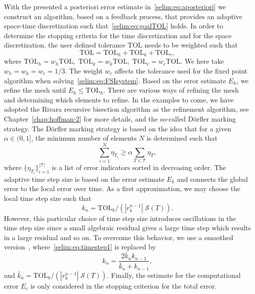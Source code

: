 With the presented a posteriori error estimate
in~\eqref{selim:eq:aposteriori} we construct an algorithm, based on a
feedback process, that provides an adaptive space-time
discretization such that~\eqref{selim:eq:goalTOL} holds. In order to
determine the stopping criteria for the time discretization and for
the space discretization, the user defined tolerance $\mathrm{TOL}$
needs to be weighted such that
\begin{equation}
\mathrm{TOL} = \mathrm{TOL}_h + \mathrm{TOL}_k + \mathrm{TOL}_c,
\end{equation}
where $\mathrm{TOL}_h = w_h \mathrm{TOL}, \;\mathrm{TOL}_k = w_k
\mathrm{TOL}, \;\mathrm{TOL}_c = w_c \mathrm{TOL}$.  We here take $w_h
= w_k = w_c = 1/3$. The weight $w_c$ affects the tolerance used for
the fixed point algorithm when
solving~\eqref{selim:eq:FSIsystem}. Based on the error estimate $E_h$,
we refine the mesh until $E_h \leq \mathrm{TOL}_h$.  There are various
ways of refining the mesh and determining which elements to refine. In
the examples to come, we have adopted the Rivara recursive bisection
algorithm as the refinement algorithm, see
Chapter~\ref{chap:hoffman-2} for more details, and the so-called
D\"{o}rfler \cite{dorfler1996} marking strategy. The D\"{o}rfler
marking strategy is based on the idea that for a given
$\alpha\in(0,1]$, the minimum number of elements $N$ is determined
  such that
\begin{equation}
  \label{selim:eq:dorfler}
\sum_{i=1}^{N}\eta_{T_i} \geq  \alpha \sum_{T\in\mathcal{T}}\eta_T ,
\end{equation}
where $\{ \eta_{T_{i}}\}_{i = 1}^{|\mathcal{T}|}$ is a list of error
indicators sorted in decreasing order.  The adaptive time step size is
based on the error estimate $E_k$ and connects the global error to the
local error over time. As a first approximation, we may choose the
local time step size such that
\begin{equation}
\label{selim:eq:timestep1}
k_n = \mathrm{TOL}_k /(| r_k^{n-1} |\; \mathcal{S}(T)).
\end{equation}
However, this particular choice of time step size introduces
oscillations in the time step size since a small algebraic residual
gives a large time step which results in a large residual and so
on. To overcome this behavior, we use a smoothed
version~\cite{Logg2003d}, where~\eqref{selim:eq:timestep1} is replaced
by
\begin{equation}
\label{selim:eq:timestep2}
k_n = \frac{2\bar{k}_n k_{n-1}}{\bar{k}_n + k_{n-1}},
\end{equation}
and $\bar{k}_n = \mathrm{TOL}_k/(| r_k^{n-1} |
\;\mathcal{S}(T))$. Finally, the estimate for the computational error
$E_c$ is only considered in the stopping criterion for the total
error.

